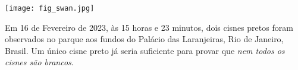 \documentclass[./main.tex]{subfiles}
\begin{document}
\nolinenumbers

\newpage
\renewcommand{\headrulewidth}{0pt}
\thispagestyle{fancy}
\fancyhf{} %
\fancyfoot{} %
\fancyfoot[C]{\thepage}

\par \hfill
\vspace{40mm}
\begin{adjustwidth}{45pt}{45pt}
\begin{center}
    \texttt{[image: fig\_swan.jpg]}\\
\end{center}
\vspace{10mm}
\noindent \textsf{Em 16 de Fevereiro de 2023, às 15 horas e 23 minutos, dois cisnes pretos foram observados no parque aos fundos do Palácio das Laranjeiras, Rio de Janeiro, Brasil. Um único cisne preto já seria suficiente para provar que \textit{nem todos os cisnes são brancos}.}
\end{adjustwidth}
\clearpage
\end{document}
